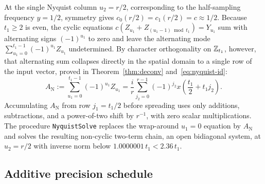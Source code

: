 At the single Nyquist column $u_2 = r/2$, corresponding to the half-sampling frequency $y = 1/2$, symmetry gives $c_0(r/2) = c_1(r/2) = c \approx 1/2$. Because $t_1 \ge 2$ is even, the cyclic equations $c(Z_{u_1} + Z_{(u_1 - 1)\bmod t_1}) = Y_{u_1}$ sum with alternating signs $(-1)^{u_1}$ to zero and leave the alternating mode $\sum_{u_1=0}^{t_1-1} (-1)^{u_1} Z_{u_1}$ undetermined. By character orthogonality on $\mathbb{Z}_{t_1}$, however, that alternating sum collapses directly in the spatial domain to a single row of the input vector, proved in Theorem~\ref{thm:deconv} and~\eqref{eq:nyquist-id}:
\[
  A_{\mathrm{N}} := \sum_{u_1=0}^{t_1-1} (-1)^{u_1} Z_{u_1}
  = \frac{i}{r}\sum_{j_2=0}^{r-1} (-1)^{j_2} x\!\left(\frac{t_1}{2} + t_1 j_2\right).
\]
Accumulating $A_{\mathrm{N}}$ from row $j_1 = t_1 / 2$ before spreading uses only additions, subtractions, and a power-of-two shift by $r^{-1}$, with zero scalar multiplications. The procedure \texttt{NyquistSolve} replaces the wrap-around $u_1 = 0$ equation by $A_{\mathrm{N}}$ and solves the resulting non-cyclic two-term chain, an open bidiagonal system, at $u_2 = r/2$ with inverse norm below $1.0000001\, t_1 < 2.36\, t_1$.

\subsection{Additive precision schedule}\label{sec:overview-precision}

